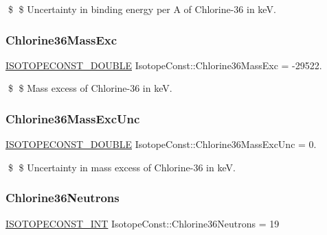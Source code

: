 \$ \$ Uncertainty in binding energy per A of Chlorine-\/36 in keV. \mbox{\label{group___isotope_const-_chlorine-_cl36_ga04a2505373daa02fd8daa1fed55a5cab}} 
\subsubsection{\texorpdfstring{Chlorine36\+Mass\+Exc}{Chlorine36MassExc}}
{\footnotesize\ttfamily \mbox{\hyperlink{group___isotope_const-_macros_ga8f45a7272ce02c0b4c65c44636ed719a}{I\+S\+O\+T\+O\+P\+E\+C\+O\+N\+S\+T\+\_\+\+D\+O\+U\+B\+LE}} Isotope\+Const\+::\+Chlorine36\+Mass\+Exc = -\/29522.}

\$ \$ Mass excess of Chlorine-\/36 in keV. \mbox{\label{group___isotope_const-_chlorine-_cl36_gad66276a13147f440c5dc2d5891a3c50c}} 
\subsubsection{\texorpdfstring{Chlorine36\+Mass\+Exc\+Unc}{Chlorine36MassExcUnc}}
{\footnotesize\ttfamily \mbox{\hyperlink{group___isotope_const-_macros_ga8f45a7272ce02c0b4c65c44636ed719a}{I\+S\+O\+T\+O\+P\+E\+C\+O\+N\+S\+T\+\_\+\+D\+O\+U\+B\+LE}} Isotope\+Const\+::\+Chlorine36\+Mass\+Exc\+Unc = 0.}

\$ \$ Uncertainty in mass excess of Chlorine-\/36 in keV. \mbox{\label{group___isotope_const-_chlorine-_cl36_gaa9daecbf9bd6ea749b382d4da5b8e654}} 
\subsubsection{\texorpdfstring{Chlorine36\+Neutrons}{Chlorine36Neutrons}}
{\footnotesize\ttfamily \mbox{\hyperlink{group___isotope_const-_macros_ga5f18360b3e99483a35c32d789e62621c}{I\+S\+O\+T\+O\+P\+E\+C\+O\+N\+S\+T\+\_\+\+I\+NT}} Isotope\+Const\+::\+Chlorine36\+Neutrons = 19}

